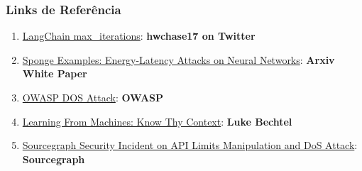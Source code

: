 \documentclass[
]{article}
\providecommand{\tightlist}{%
  \setlength{\itemsep}{0pt}\setlength{\parskip}{0pt}}
\begin{document}
\subsubsection{Links de Referência}\label{links-de-referuxeancia}

\begin{enumerate}
\def\labelenumi{\arabic{enumi}.}
\tightlist
\item
  \href{https://twitter.com/hwchase17/status/1608467493877579777}{LangChain
  max\_iterations}: \textbf{hwchase17 on Twitter}
\item
  \href{https://arxiv.org/abs/2006.03463}{Sponge Examples:
  Energy-Latency Attacks on Neural Networks}: \textbf{Arxiv White Paper}
\item
  \href{https://owasp.org/www-community/attacks/Denial_of_Service}{OWASP
  DOS Attack}: \textbf{OWASP}
\item
  \href{https://lukebechtel.com/blog/lfm-know-thy-context}{Learning From
  Machines: Know Thy Context}: \textbf{Luke Bechtel}
\item
  \href{https://about.sourcegraph.com/blog/security-update-august-2023}{Sourcegraph
  Security Incident on API Limits Manipulation and DoS Attack}:
  \textbf{Sourcegraph}
\end{enumerate}
\end{document}
